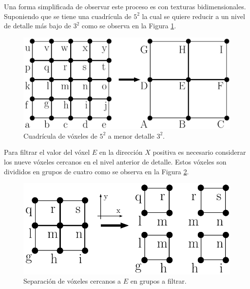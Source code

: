 Una forma simplificada de observar este proceso es con texturas bidimensionales. Suponiendo que se tiene una cuadrícula de $5^2$ la cual se quiere reducir a un nivel de detalle más bajo de $3^2$ como se observa en la Figura \ref{fig:filter_objs}.

\begin{figure}[H]
    \centering
    \includegraphics[width=.5\linewidth]{media/filtering_1.pdf}
    \caption{Cuadrícula de vóxeles de $5^2$ a menor detalle $3^2$.}
   	\label{fig:filter_objs}
\end{figure}

Para filtrar el valor del vóxel $E$ en la dirección $X$ positiva es necesario considerar los nueve vóxeles cercanos en el nivel anterior de detalle. Estos vóxeles son divididos en grupos de cuatro como se observa en la Figura \ref{fig:filter_groups}.

\begin{figure}[H]
    \centering
    \includegraphics[width=.5\linewidth]{media/filtering_2.pdf}
    \caption{Separación de vóxeles cercanos a $E$ en grupos a filtrar.}
    \label{fig:filter_groups}
\end{figure}

